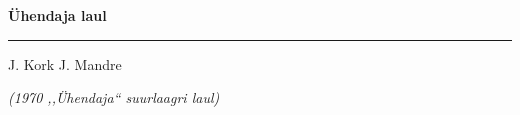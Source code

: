 \documentclass[12pt]{extbook}
\begin{document}
{
  \samepage
  \raggedbottom
  \raggedright
  \sloppy


  \vspace{0.2in}
    \centerline{
      \bfseries
      \large \"Uhendaja laul
    }
  \nopagebreak[4]
  \vspace{0.1in}
  \nopagebreak[4]
  \hrule height 0.05ex
  \nopagebreak[4]
  \vspace{-0.05in}

  {\footnotesize J. Kork \hfill J. Mandre }\\
  \vspace{0.01in}

  {\em {\footnotesize (1970 ,,\"Uhendaja{``} suurlaagri laul) } }
  \vspace{0.01in}


}
\end{document}
